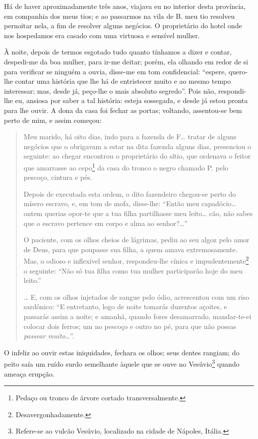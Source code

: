 Há de haver aproximadamente três anos, viajava eu no interior desta
província, em companhia dos meus tios; e ao passarmos na vila de B. meu
tio resolveu pernoitar nela, a fim de resolver alguns negócios. O
proprietário do hotel onde nos hospedamos era casado com uma virtuosa e
sensível mulher.

À noite, depois de termos esgotado tudo quanto tínhamos a dizer e
contar, despedi-me da boa mulher, para ir-me deitar; porém, ela olhando
em redor de si para verificar se ninguém a ouvia, disse-me em tom
confidencial: ``espere, quero-lhe contar uma história que lhe há de
entristecer muito e ao mesmo tempo interessar; mas, desde já, peço-lhe o
mais absoluto segredo''. Pois não, respondi-lhe eu, ansiosa por saber a
tal história: esteja sossegada, e desde já estou pronta para lhe ouvir.
A dona da casa foi fechar as portas; voltando, assentou-se bem perto de
mim, e assim começou:

\begin{quote}
Meu marido, há oito dias, indo para a fazenda de F\ldots{} tratar de alguns
negócios que o obrigavam a estar na dita fazenda alguns dias, presenciou
o seguinte: ao chegar encontrou o proprietário do sítio, que ordenava o
feitor que amarrasse ao cepo\footnote{Pedaço ou tronco de árvore
  cortado transversalmente.} da casa do tronco o negro chamado P. pelo
pescoço, cintura e pés.

Depois de executada esta ordem, o dito fazendeiro chegou-se perto do
mísero escravo, e, em tom de mofa, disse-lhe: ``Então meu capadócio\ldots{}
ontem querias opor-te que a tua filha partilhasse meu leito\ldots{} cão, não
sabes que o escravo pertence em corpo e alma ao senhor?\ldots{}''

O paciente, com os olhos cheios de lágrimas, pediu ao seu algoz pelo
amor de Deus, para que poupasse sua filha, a quem amava extremosamente.
Mas, o odioso e inflexível senhor, respondeu-lhe cínica e
impudentemente\footnote{Desavergonhadamente.} o seguinte: ``Não só tua
filha como tua mulher participarão hoje do meu leito.''

\ldots{} E, com os olhos injetados de sangue pelo ódio, acrescentou com um
riso sardônico: ``E entretanto, logo de noite tomarás duzentos açoites, e
passarás assim a noite; e amanhã, quando fores desamarrado, mandar-te-ei
colocar dois ferros; um no pescoço e outro no pé, para que não possas
\emph{passear muito}\ldots{}''.
\end{quote}

O infeliz ao ouvir estas iniquidades, fechara os olhos; seus dentes
rangiam; do peito saía um ruído surdo semelhante àquele que se ouve no
Vesúvio\footnote{Refere-se ao vulcão Vesúvio, localizado na cidade de
  Nápoles, Itália.} quando ameaça erupção.

